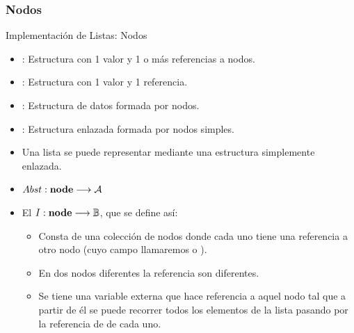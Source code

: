 \documentclass[10pt,envcountsect,spanish]{beamer}
\begin{document}
\subsubsection{Nodos}


\begin{frame}[fragile]{Implementación de Listas: Nodos}

\begin{itemize}
\item {}: Estructura con 1 valor y 1 o más referencias a nodos.

\item {}: Estructura con 1 valor y 1 referencia.


\item {}: Estructura de datos formada por nodos.

\item {}: Estructura enlazada formada por nodos simples.

\item Una lista se puede representar mediante una estructura simplemente enlazada.

\item {} $Abst: \mbox{\textbf{node}} \longrightarrow {\cal A}$

\centerline{}

\item El  
$I: \mbox{\textbf{node}} \longrightarrow \mathbb{B}$, que se define así:
\begin{itemize}
\item Consta de una colección de nodos donde cada uno tiene una referencia a otro nodo (cuyo campo llamaremos  o ).

\item En dos nodos diferentes la referencia  son diferentes.

\item Se tiene una variable externa que hace referencia a aquel nodo tal que a partir de él se puede recorrer todos los elementos de la lista pasando por la referencia de  de cada uno.
\end{itemize}

\end{itemize}

\end{frame}
\end{document}
